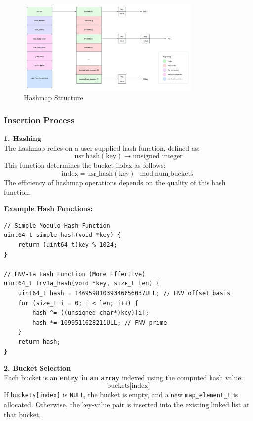 \documentclass[titlepage]{article}
\begin{document}
\begin{figure}[H]
    \centering
    \includegraphics[width=0.8\textwidth]{hashmap_structure.pdf}
    \caption{Hashmap Structure}
    \label{fig:hashmap-structure}
\end{figure}



\subsubsection{Insertion Process}

\textbf{1. Hashing} \\
The hashmap relies on a user-supplied hash function, defined as:
\[
\text{usr\_hash}(\text{key}) \rightarrow \text{unsigned integer}
\]
This function determines the bucket index as follows:
\[
\text{index} = \text{usr\_hash}(\text{key}) \mod \text{num\_buckets}
\]
The efficiency of hashmap operations depends on the quality of this hash function.

\textbf{Example Hash Functions:}
\begin{verbatim}
// Simple Modulo Hash Function
uint64_t simple_hash(void *key) {
    return (uint64_t)key % 1024;
}

// FNV-1a Hash Function (More Effective)
uint64_t fnv1a_hash(void *key, size_t len) {
    uint64_t hash = 14695981039346656037ULL; // FNV offset basis
    for (size_t i = 0; i < len; i++) {
        hash ^= ((unsigned char*)key)[i];
        hash *= 1099511628211ULL; // FNV prime
    }
    return hash;
}
\end{verbatim}

\textbf{2. Bucket Selection} \\
Each bucket is an \textbf{entry in an array} indexed using the computed hash value:
\[
\text{buckets[index]}
\]
If \texttt{buckets[index]} is \texttt{NULL}, the bucket is empty, and a new \texttt{map\_element\_t} is allocated. Otherwise, the key-value pair is inserted into the existing linked list at that bucket.
\end{document}
